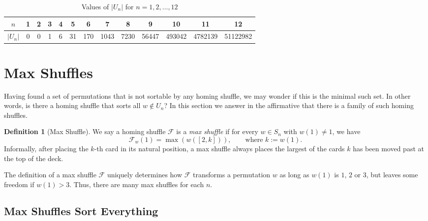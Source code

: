 \documentclass[final,nomarks]{dmtcs-episciences}
\theoremstyle{definition}
\theoremstyle{definition}
\newtheorem{defn}[thm]{Definition}
\theoremstyle{remark}
\newcommand{\f}{\mathcal{F}} %
\newcommand{\fw}{\mathcal{F}_w} %
\newcommand{\tup}[1]{\left( #1 \right)}
\newcommand{\card}[1]{\left| #1 \right|}
\begin{document}
\begin{table}[!h]
\label{Un_1-12}
\begin{center}
\begin{tabular}{|c|c|c|c|c|c|c|c|c|c|c|c|c|}
     \hline
     $n$ &  1 & 2 & 3 & 4 & 5 & 6 & 7 & 8 & 9 & 10 & 11 & 12 \\
     \hline 
     $\card{U_n}$ & 0 & 0 & 1 & 6 & 31 & 170 & 1043 & 7230 & 56447 & 493042 & 4782139 & 51122982\\
     \hline
\end{tabular}
\caption{Values of $\card{U_n}$ for $n=1,2,\dots,12$}
\end{center}
\end{table}


\section{Max Shuffles}
Having found a set of permutations that is not sortable by any homing shuffle, we may wonder if this is the minimal such set.
In other words, is there a homing shuffle that sorts all $w \notin U_n$? In this section we answer in the affirmative that there is a family of such homing shuffles.
\begin{defn}[Max Shuffle]
    \label{mShuf}
   We say a homing shuffle $ \f $ is a \emph{max shuffle} if for every $w \in S_n$ with $w\tup{1} \neq 1$, we have
   \[
   \fw\tup{ 1 } = \max \tup{ w\tup{ [2,k]}},
   \qquad \text{where $k := w\tup{1}$}.
   \]
   Informally, after placing the $ k $-th card in its natural position, a max shuffle always places the largest of the cards $k$ has been moved past at the top of the deck.
\end{defn}

The definition of a max shuffle $\f$ uniquely determines how $\f$ transforms a permutation $w$ as long as $w\tup{1}$ is $1$, $2$ or $3$, but leaves some freedom if $w\tup{1} > 3$. Thus, there are many max shuffles for each $n$.


\subsection{Max Shuffles Sort Everything}
\end{document}
